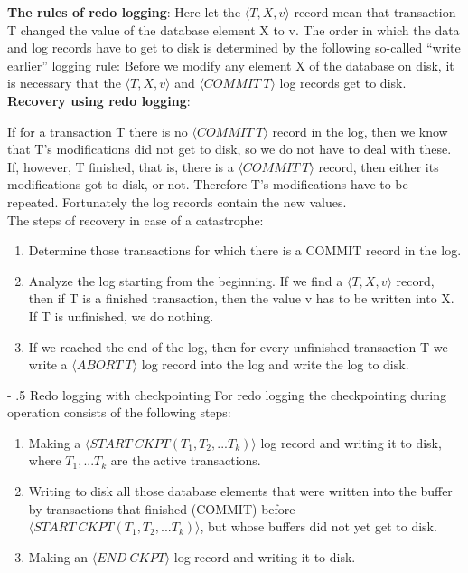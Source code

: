 \documentclass[margin=0px]{article}
\makeatletter
\renewcommand\paragraph{%
	\@startsection{paragraph}{4}{0mm}%
	{-\baselineskip}%
	{.5\baselineskip}%
	{\normalfont\normalsize\bfseries}}
\makeatother
\begin{document}
\noindent \textbf{The rules of redo logging}:
Here let the $\langle T,X,v\rangle$ record mean that transaction T changed the value of the database element X to v.
The order in which the data and log records have to get to disk is determined by the following so-called ``write earlier''
logging rule: Before we modify any element X of the database on disk, it is necessary that
the $\langle T,X,v\rangle$ and $\langle COMMIT \ T\rangle$ log records get to disk.\\

\noindent \textbf{Recovery using redo logging}:

If for a transaction T there is no $\langle COMMIT \ T\rangle$ record in the log, then we know that T's modifications
did not get to disk, so we do not have to deal with these. If, however, T finished, that is, there is a $\langle COMMIT \ T\rangle$
record, then either its modifications got to disk, or not. Therefore T's modifications have to be repeated. Fortunately
the log records contain the new values.\\

\noindent The steps of recovery in case of a catastrophe:
\begin{enumerate}
    \item	Determine those transactions for which there is a COMMIT record in the log.
    \item	Analyze the log starting from the beginning. If we find a $\langle T,X,v\rangle$ record, then
          if T is a finished transaction, then the value v has to be written into X. If T is unfinished, we do nothing.
    \item	If we reached the end of the log, then for every unfinished transaction T we write a $\langle ABORT \ T\rangle$
          log record into the log and write the log to disk.
\end{enumerate}

\paragraph{Redo logging with checkpointing}
For redo logging the checkpointing during operation consists of the following steps:
\begin{enumerate}
    \item	Making a $\langle START \ CKPT(T_{1},T_{2},...T_{k}) \rangle$ log record and writing it to disk, where
          $T_{1}, ... T_{k}$ are the active transactions.

    \item	Writing to disk all those database elements that were written into the buffer by transactions that
          finished (COMMIT) before $\langle START \ CKPT(T_{1},T_{2},...T_{k}) \rangle$, but whose buffers did not yet get
          to disk.

    \item	Making an $\langle END \ CKPT \rangle$ log record and writing it to disk.
\end{enumerate}
\end{document}
